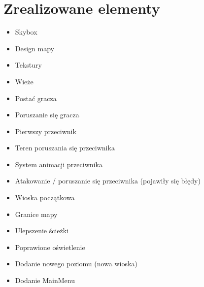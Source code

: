 \documentclass[10pt,a4paper]{article}
\begin{document}
\section{Zrealizowane elementy}
\begin{itemize}
  \item Skybox
  \item Design mapy
  \item Tekstury
  \item Wieże
  \item Postać gracza
  \item Poruszanie się gracza
  \item Pierwszy przeciwnik
  \item Teren poruszania się przeciwnika
  \item System animacji przeciwnika
  \item Atakowanie / poruszanie się przeciwnika (pojawiły się błędy)
  \item Wioska początkowa
  \item Granice mapy
  \item Ulepszenie ścieżki 
  \item Poprawione oświetlenie
  \item Dodanie nowego poziomu (nowa wioska)
  \item Dodanie MainMenu
\end{itemize}
\end{document}
